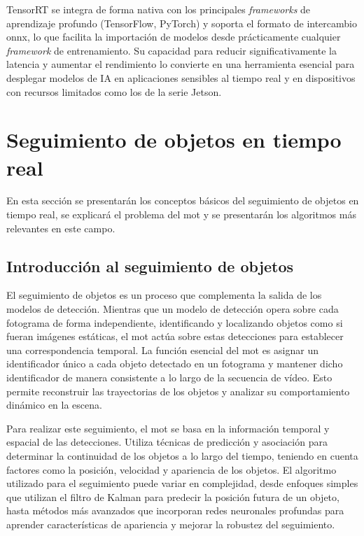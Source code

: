 \documentclass[11pt,spanish,listoffigures,listoftables]{tfgetsinf}
\begin{document}
TensorRT se integra de forma nativa con los principales \textit{frameworks} de aprendizaje profundo (TensorFlow, PyTorch) y soporta el formato de intercambio \gls{onnx}, lo que facilita la importación de modelos desde prácticamente cualquier \textit{framework} de entrenamiento. Su capacidad para reducir significativamente la latencia y aumentar el rendimiento lo convierte en una herramienta esencial para desplegar modelos de IA en aplicaciones sensibles al tiempo real y en dispositivos con recursos limitados como los de la serie Jetson.



\section{Seguimiento de objetos en tiempo real} \label{sec:mot}
En esta sección se presentarán los conceptos básicos del seguimiento de objetos en tiempo real, se explicará el problema del \gls{mot} y se presentarán los algoritmos más relevantes en este campo.

\subsection{Introducción al seguimiento de objetos} \label{sec:introduccion_seguimiento_objetos}
El seguimiento de objetos es un proceso que complementa la salida de los modelos de detección. Mientras que un modelo de detección opera sobre cada fotograma de forma independiente, identificando y localizando objetos como si fueran imágenes estáticas, el \gls{mot} actúa sobre estas detecciones para establecer una correspondencia temporal. La función esencial del \gls{mot} es asignar un identificador único a cada objeto detectado en un fotograma y mantener dicho identificador de manera consistente a lo largo de la secuencia de vídeo. Esto permite reconstruir las trayectorias de los objetos y analizar su comportamiento dinámico en la escena.

Para realizar este seguimiento, el \gls{mot} se basa en la información temporal y espacial de las detecciones. Utiliza técnicas de predicción y asociación para determinar la continuidad de los objetos a lo largo del tiempo, teniendo en cuenta factores como la posición, velocidad y apariencia de los objetos. El algoritmo utilizado para el seguimiento puede variar en complejidad, desde enfoques simples que utilizan el filtro de Kalman\cite{kalman1960new} para predecir la posición futura de un objeto, hasta métodos más avanzados que incorporan redes neuronales profundas para aprender características de apariencia y mejorar la robustez del seguimiento.
\end{document}
